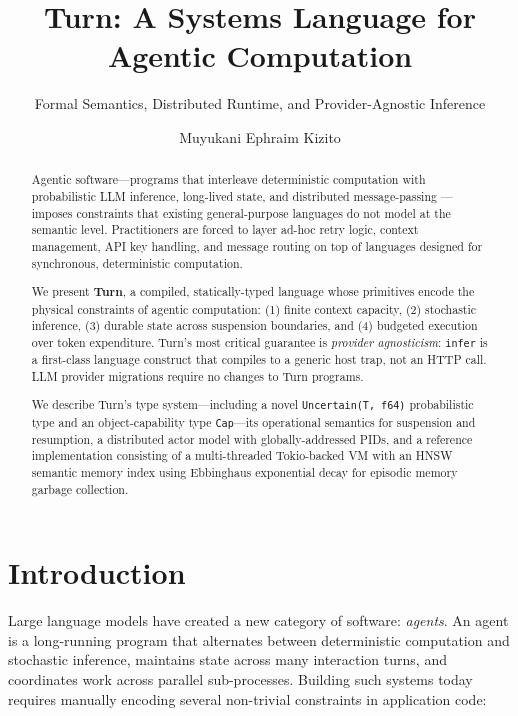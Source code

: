 \documentclass[sigplan,10pt,review,anonymous]{acmart}
\title{Turn: A Systems Language for Agentic Computation}
\subtitle{Formal Semantics, Distributed Runtime, and Provider-Agnostic Inference}
\author{Muyukani Ephraim Kizito}
\affiliation{\institution{Independent Research}}
\begin{document}
\maketitle

\begin{abstract}
Agentic software—programs that interleave deterministic computation with
probabilistic LLM inference, long-lived state, and distributed message-passing
—imposes constraints that existing general-purpose languages do not model at
the semantic level. Practitioners are forced to layer ad-hoc retry logic,
context management, API key handling, and message routing on top of languages
designed for synchronous, deterministic computation.

We present \textbf{Turn}, a compiled, statically-typed language whose
primitives encode the physical constraints of agentic computation: (1) finite
context capacity, (2) stochastic inference, (3) durable state across
suspension boundaries, and (4) budgeted execution over token expenditure.
Turn's most critical guarantee is \emph{provider agnosticism}: \texttt{infer}
is a first-class language construct that compiles to a generic host trap, not
an HTTP call. LLM provider migrations require no changes to Turn programs.

We describe Turn's type system—including a novel \texttt{Uncertain(T, f64)}
probabilistic type and an object-capability type \texttt{Cap}—its operational
semantics for suspension and resumption, a distributed actor model with
globally-addressed PIDs, and a reference implementation consisting of a
multi-threaded Tokio-backed VM with an HNSW semantic memory index using
Ebbinghaus exponential decay for episodic memory garbage collection.

\end{abstract}


\section{Introduction}

Large language models have created a new category of software: \emph{agents}.
An agent is a long-running program that alternates between deterministic
computation and stochastic inference, maintains state across many interaction
turns, and coordinates work across parallel sub-processes. Building such
systems today requires manually encoding several non-trivial constraints in
application code:
\end{document}
